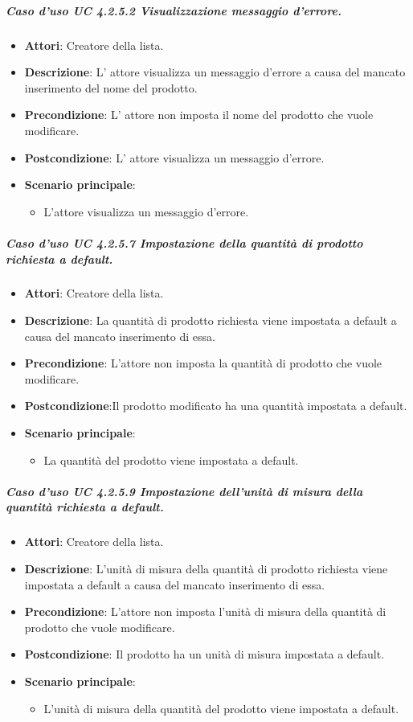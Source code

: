 \subparagraph{Caso d'uso UC 4.2.5.2 Visualizzazione messaggio d'errore.}
	\begin{itemize}
		\item\textbf{Attori}: Creatore della lista.
		\item\textbf{Descrizione}: L' attore visualizza un messaggio d'errore a causa del mancato inserimento del nome del prodotto.
		\item\textbf{Precondizione}: L' attore non imposta il nome del prodotto che vuole modificare.
		\item\textbf{Postcondizione}: L' attore visualizza un messaggio d'errore.
		\item\textbf{Scenario principale}:
			\begin{itemize}
				\item L'attore visualizza un messaggio d'errore. 
			\end{itemize}
		
	\end{itemize}
	
\subparagraph{Caso d'uso UC 4.2.5.7 Impostazione della quantità di prodotto richiesta a default.}
	\begin{itemize}
		\item\textbf{Attori}: Creatore della lista.
		\item\textbf{Descrizione}: La quantità di prodotto richiesta viene impostata a default a causa del mancato inserimento di essa.
		\item\textbf{Precondizione}: L'attore non imposta la quantità di prodotto che vuole modificare.
		\item\textbf{Postcondizione}:Il prodotto modificato ha una quantità  impostata a default.
		\item\textbf{Scenario principale}:
			\begin{itemize}
				\item La quantità del prodotto viene impostata a default.
			\end{itemize}
		
	\end{itemize}
\subparagraph{Caso d'uso UC 4.2.5.9 Impostazione dell'unità di misura della quantità richiesta a default.}
	\begin{itemize}
		\item\textbf{Attori}: Creatore della lista.
		\item\textbf{Descrizione}: L'unità di misura della quantità di prodotto richiesta viene impostata a default a causa del mancato inserimento di essa.
		\item\textbf{Precondizione}: L'attore non imposta l'unità di misura della quantità di prodotto che vuole modificare.
		\item\textbf{Postcondizione}: Il prodotto ha un unità di misura impostata a default.
		\item\textbf{Scenario principale}:
			\begin{itemize}
				\item L'unità di misura della quantità del prodotto viene impostata a default.
			\end{itemize}
		
\end{itemize}
